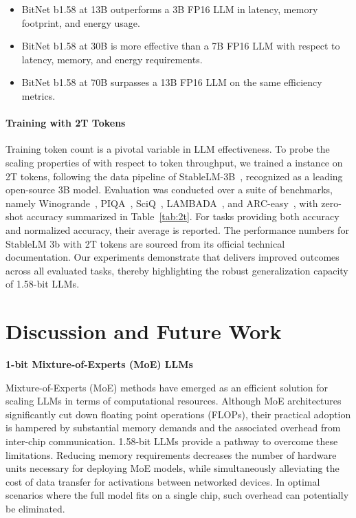 \begin{itemize}
    \item BitNet b1.58 at 13B outperforms a 3B FP16 LLM in latency, memory footprint, and energy usage.
    \item BitNet b1.58 at 30B is more effective than a 7B FP16 LLM with respect to latency, memory, and energy requirements.
    \item BitNet b1.58 at 70B surpasses a 13B FP16 LLM on the same efficiency metrics.
\end{itemize}

\paragraph{Training with 2T Tokens}

Training token count is a pivotal variable in LLM effectiveness. To probe the scaling properties of  with respect to token throughput, we trained a  instance on 2T tokens, following the data pipeline of StableLM-3B~\cite{StableLM-3B-4E1T}, recognized as a leading open-source 3B model. Evaluation was conducted over a suite of benchmarks, namely Winogrande~\cite{winoGrande}, PIQA~\cite{piqa}, SciQ~\cite{sciq}, LAMBADA~\cite{lambada}, and ARC-easy~\cite{arc}, with zero-shot accuracy summarized in Table~\ref{tab:2t}. For tasks providing both accuracy and normalized accuracy, their average is reported. The performance numbers for StableLM 3b with 2T tokens are sourced from its official technical documentation. Our experiments demonstrate that  delivers improved outcomes across all evaluated tasks, thereby highlighting the robust generalization capacity of 1.58-bit LLMs.

\section{Discussion and Future Work}

\textbf{1-bit Mixture-of-Experts (MoE) LLMs}

Mixture-of-Experts (MoE) methods have emerged as an efficient solution for scaling LLMs in terms of computational resources. Although MoE architectures significantly cut down floating point operations (FLOPs), their practical adoption is hampered by substantial memory demands and the associated overhead from inter-chip communication. 1.58-bit LLMs provide a pathway to overcome these limitations. Reducing memory requirements decreases the number of hardware units necessary for deploying MoE models, while simultaneously alleviating the cost of data transfer for activations between networked devices. In optimal scenarios where the full model fits on a single chip, such overhead can potentially be eliminated.

